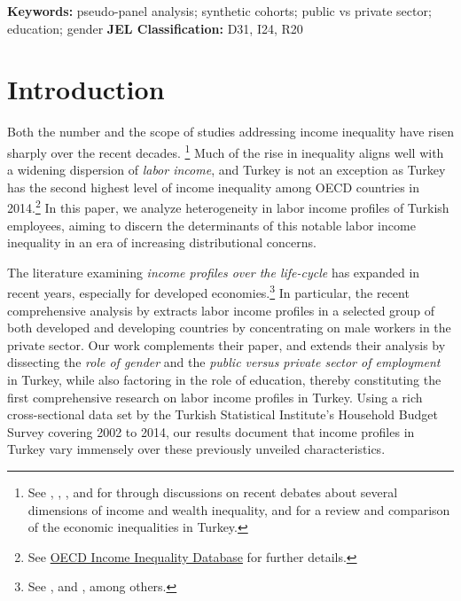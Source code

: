 \documentclass[12pt,author-year]{article}
\begin{document}
\vspace{0pt}
\hspace{-23pt}\textbf{Keywords:} pseudo-panel analysis; synthetic cohorts; public vs private sector; education; gender\vspace{2pt}\newline 
\textbf{JEL Classification:}  D31, I24, R20 

\newpage
\doublespacing
\section{Introduction}
Both the number and the scope of studies addressing income inequality have risen sharply over the recent decades.%
\footnote{See \cite{Piketty}, \cite{Piketty2}, \cite{Atkinson}, \cite{Milanovic} and \cite{Saez} for through discussions on recent debates about several dimensions of income and wealth inequality, and \cite{Tamkoc08} for a review and comparison of the economic inequalities in Turkey.} Much of the rise in inequality aligns well with a widening dispersion of \emph{labor income}, and Turkey is not an exception as Turkey has the second highest level of income inequality among OECD countries in 2014.\footnote{See \href{http://data..org/inequality/income-inequality.htm}{OECD Income Inequality Database} for further details.} In this paper, we analyze heterogeneity in labor income profiles of Turkish employees, aiming to discern the determinants of this notable labor income inequality in an era of increasing distributional concerns.


The literature examining \emph{income profiles over the life-cycle} has expanded in recent years, especially for developed economies.\footnote{See \cite{Lagakos}, \cite{Kolasa} and \cite{Rupert}, among others.} In particular, the recent comprehensive analysis by \cite{Lagakos} extracts labor income profiles in a selected group of both developed and developing countries by concentrating on male workers in the private sector. Our work complements their paper, and extends their analysis by dissecting the \emph{role of gender} and the \emph{public versus private sector of employment} in Turkey, while also factoring in the role of education, thereby constituting the first comprehensive research on labor income profiles in Turkey. Using a rich cross-sectional data set by the Turkish Statistical Institute's Household Budget Survey covering 2002 to 2014, our results document that income profiles in Turkey vary immensely over these previously unveiled characteristics.
\end{document}
